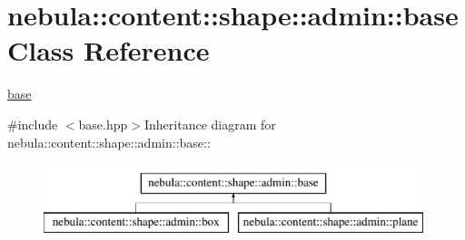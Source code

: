 \hypertarget{classnebula_1_1content_1_1shape_1_1admin_1_1base}{
\section{nebula::content::shape::admin::base Class Reference}
\label{classnebula_1_1content_1_1shape_1_1admin_1_1base}
}


\hyperlink{classnebula_1_1content_1_1shape_1_1admin_1_1base}{base}  


{\ttfamily \#include $<$base.hpp$>$}Inheritance diagram for nebula::content::shape::admin::base::\begin{figure}[H]
\begin{center}
\leavevmode
\includegraphics[height=2cm]{classnebula_1_1content_1_1shape_1_1admin_1_1base}
\end{center}
\end{figure}
